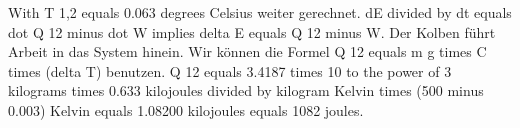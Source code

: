 With T 1,2 equals 0.063 degrees Celsius weiter gerechnet. dE divided by dt equals dot Q 12 minus dot W implies delta E equals Q 12 minus W. Der Kolben führt Arbeit in das System hinein. Wir können die Formel Q 12 equals m g times C times (delta T) benutzen. Q 12 equals 3.4187 times 10 to the power of 3 kilograms times 0.633 kilojoules divided by kilogram Kelvin times (500 minus 0.003) Kelvin equals 1.08200 kilojoules equals 1082 joules.